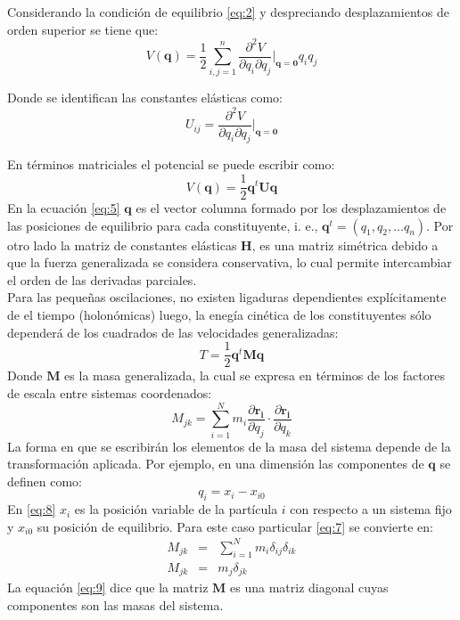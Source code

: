 Considerando la condici\'{o}n de equilibrio \eqref{eq:2} y despreciando desplazamientos de orden superior se tiene que:
\begin{equation}\label{eq:3}
V(\mathbf{q})=\frac{1}{2}\sum_{i,j=1}^{n}\frac{\partial^2 V }{\partial q_i\partial q_j}\bigg|_{\mathbf{q}=\mathbf{0}}q_i q_j
\end{equation}

Donde se identifican las constantes el\'{a}sticas como:
\begin{equation}\label{eq:4}
U_{ij}=\frac{\partial^2 V }{\partial q_i\partial q_j}\bigg|_{\mathbf{q}=\mathbf{0}}
\end{equation}

En t\'{e}rminos matriciales el potencial se puede escribir como:
\begin{equation}\label{eq:5}
V(\mathbf{q})=\frac{1}{2}\mathbf{q}^t\mathbf{U}\mathbf{q}
\end{equation}
En la ecuaci\'{o}n \eqref{eq:5} $\mathbf{q}$ es el vector columna formado por los desplazamientos de las posiciones de equilibrio para cada constituyente, i. e., $\mathbf{q}^t=(q_1,q_2,...q_n)$. Por otro lado la matriz de constantes el\'{a}sticas $\mathbf{H}$, es una matriz sim\'{e}trica debido a que la fuerza generalizada se considera conservativa, lo cual permite intercambiar el orden de las derivadas parciales.\\

Para las peque\~{n}as oscilaciones, no existen ligaduras dependientes expl\'{i}citamente de el tiempo (holon\'{o}micas) luego, la eneg\'{i}a cin\'{e}tica de los constituyentes s\'{o}lo depender\'{a} de los cuadrados de las velocidades generalizadas:
\begin{equation}\label{eq:6}
T=\frac{1}{2}\mathbf{q}^t\mathbf{M}\mathbf{q}
\end{equation}
Donde $\mathbf{M}$ es la masa generalizada, la cual se expresa en t\'{e}rminos de los factores de escala entre sistemas coordenados:
\begin{equation}\label{eq:7}
M_{jk}=\sum_{i=1}^{N} m_{i}\frac{\partial \mathbf{r_{i}} }{\partial q_j}\cdot\frac{\partial \mathbf{r_{i}} }{\partial q_k}
\end{equation}
La forma en que se escribir\'{a}n los elementos de la masa del sistema depende de la transformaci\'{o}n aplicada. Por ejemplo, en una dimensi\'{o}n las componentes de $\mathbf{q}$ se definen como:
\begin{equation}\label{eq:8}
q_i=x_i-x_{i0}
\end{equation}
En \eqref{eq:8} $x_i$ es la posici\'{o}n variable de la part\'{i}cula $i$ con respecto a un sistema fijo y $x_{i0}$ su posici\'{o}n de equilibrio. Para este caso particular \eqref{eq:7} se convierte en:
\begin{eqnarray}\label{eq:9}
M_{jk}&=&\sum_{i=1}^{N} m_{i} \delta_{ij}\delta_{ik}\nonumber \\
M_{jk}&=&m_{j} \delta_{jk}
\end{eqnarray}
La equaci\'{o}n \eqref{eq:9} dice que la matriz $\mathbf{M}$ es una matriz diagonal cuyas componentes son las masas del sistema.\\

